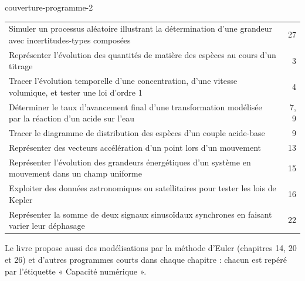\begin{blocEdition}{couverture-programme-2}
{\begin{tabularx}{\linewidth}{@{}Yr@{}}
Simuler un processus aléatoire illustrant la détermination d'une grandeur avec incertitudes-types composées & 27 \\
Représenter l'évolution des quantités de matière des espèces au cours d'un titrage & 3 \\
Tracer l'évolution temporelle d'une concentration, d'une vitesse volumique, et tester une loi d'ordre 1 & 4 \\
Déterminer le taux d'avancement final d'une transformation modélisée par la réaction d'un acide sur l'eau & 7, 9 \\
Tracer le diagramme de distribution des espèces d'un couple acide-base & 9 \\
Représenter des vecteurs accélération d'un point lors d'un mouvement & 13 \\
Représenter l'évolution des grandeurs énergétiques d'un système en mouvement dans un champ uniforme & 15 \\
Exploiter des données astronomiques ou satellitaires pour tester les lois de Kepler & 16 \\
Représenter la somme de deux signaux sinusoïdaux synchrones en faisant varier leur déphasage & 22 \\\bottomrule
\end{tabularx}}\par\smallskip
Le livre propose aussi des modélisations par la méthode d'Euler (chapitres 14, 20 et 26) et d'autres programmes courts dans
chaque chapitre : chacun est repéré par l'étiquette « Capacité numérique ».
\end{blocEdition}
